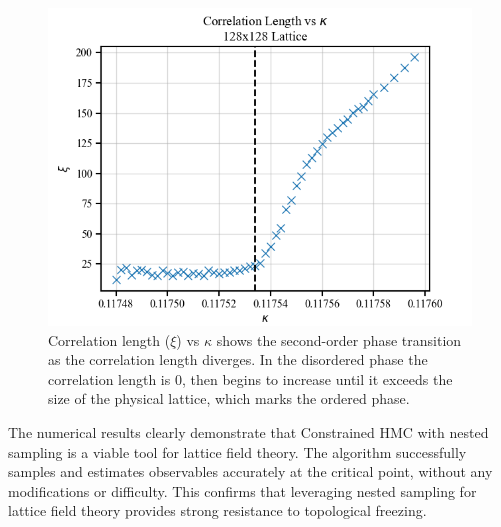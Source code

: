 \documentclass[11pt]{article}
\begin{document}
    \begin{figure}[h!]
        \center
        \includegraphics[width=\linewidth]{../figures/CorrelationLength}
        \caption{
            Correlation length ($\xi$) vs $\kappa$ shows the second-order phase transition as the correlation length
            diverges.
            In the disordered phase the correlation length is 0, then begins to increase until it
            exceeds the size of the physical lattice, which marks the ordered phase.
        }\label{fig:correlation_length}
    \end{figure}

    The numerical results clearly demonstrate that Constrained HMC with nested sampling is a viable tool for
    lattice field theory.
    The algorithm successfully samples and estimates observables accurately at the critical point, without any
    modifications or difficulty.
    This confirms that leveraging nested sampling for lattice field theory provides strong resistance to topological freezing.
\end{document}
